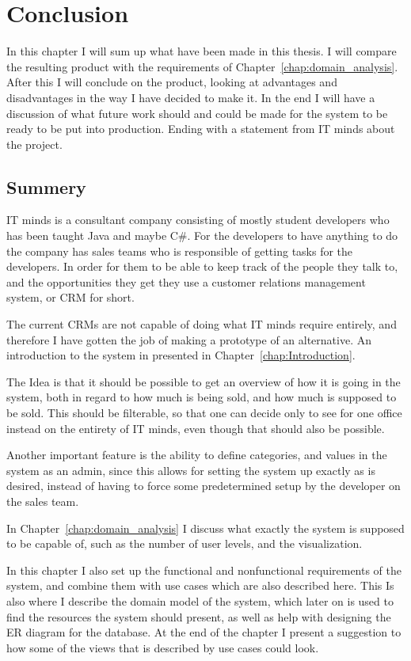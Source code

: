 \chapter{Conclusion}
\label{chap:Conclusion}
In this chapter I will sum up what have been made in this thesis. I will compare
the resulting product with the requirements of
Chapter~\ref{chap:domain_analysis}. After this I will conclude on the product,
looking at advantages and disadvantages in the way I have decided to make it.
In the end I will have a discussion of what future work should and could be made
for the system to be ready to be put into production. Ending with a statement
from IT minds about the project.

\section{Summery}
IT minds is a consultant company consisting of mostly student developers who has
been taught Java and maybe C\#. For the developers to have anything to do the
company has sales teams who is responsible of getting tasks for the developers.
In order for them to be able to keep track of the people they talk to, and the
opportunities they get they use a customer relations management system, or CRM
for short. 

The current CRMs are not capable of doing what IT minds require entirely, and
therefore I have gotten the job of making a prototype of an alternative. An
introduction to the system in presented in Chapter~\ref{chap:Introduction}.

The Idea is that it should be possible to get an overview of how it is going in
the system, both in regard to how much is being sold, and how much is supposed
to be sold. This should be filterable, so that one can decide only to see for
one office instead on the entirety of IT minds, even though that should also be
possible. 

Another important feature is the ability to define categories, and
values in the system as an admin, since this allows for setting the system
up exactly as is desired, instead of having to force some predetermined setup by
the developer on the sales team.

In Chapter~\ref{chap:domain_analysis} I discuss what exactly the system is
supposed to be capable of, such as the number of user levels, and the
visualization.

In this chapter I also set up the functional and nonfunctional requirements of
the system, and combine them with use cases which are also described here. This
Is also where I describe the domain model of the system, which later on is used
to find the resources the system should present, as well as help with designing
the ER diagram for the database. At the end of the chapter I present a suggestion
to how some of the views that is described by use cases could look.

